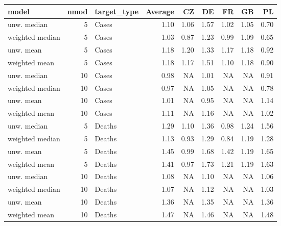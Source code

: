 
\begin{tabular}{l|r|l|r|r|r|r|r|r}
\hline
model & nmod & target\_type & Average & CZ & DE & FR & GB & PL\\
\hline
unw. median & 5 & Cases & 1.10 & 1.06 & 1.57 & 1.02 & 1.05 & 0.70\\
\hline
weighted median & 5 & Cases & 1.03 & 0.87 & 1.23 & 0.99 & 1.09 & 0.65\\
\hline
unw. mean & 5 & Cases & 1.18 & 1.20 & 1.33 & 1.17 & 1.18 & 0.92\\
\hline
weighted mean & 5 & Cases & 1.18 & 1.17 & 1.51 & 1.10 & 1.18 & 0.90\\
\hline
unw. median & 10 & Cases & 0.98 & NA & 1.01 & NA & NA & 0.91\\
\hline
weighted median & 10 & Cases & 0.97 & NA & 1.05 & NA & NA & 0.78\\
\hline
unw. mean & 10 & Cases & 1.01 & NA & 0.95 & NA & NA & 1.14\\
\hline
weighted mean & 10 & Cases & 1.11 & NA & 1.16 & NA & NA & 1.02\\
\hline
unw. median & 5 & Deaths & 1.29 & 1.10 & 1.36 & 0.98 & 1.24 & 1.56\\
\hline
weighted median & 5 & Deaths & 1.13 & 0.93 & 1.29 & 0.84 & 1.19 & 1.28\\
\hline
unw. mean & 5 & Deaths & 1.45 & 0.99 & 1.68 & 1.42 & 1.19 & 1.65\\
\hline
weighted mean & 5 & Deaths & 1.41 & 0.97 & 1.73 & 1.21 & 1.19 & 1.63\\
\hline
unw. median & 10 & Deaths & 1.08 & NA & 1.10 & NA & NA & 1.06\\
\hline
weighted median & 10 & Deaths & 1.07 & NA & 1.12 & NA & NA & 1.03\\
\hline
unw. mean & 10 & Deaths & 1.36 & NA & 1.35 & NA & NA & 1.36\\
\hline
weighted mean & 10 & Deaths & 1.47 & NA & 1.46 & NA & NA & 1.48\\
\hline
\end{tabular}